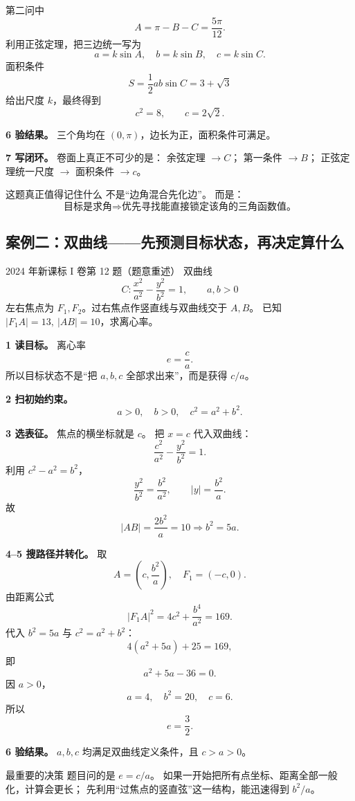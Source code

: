 \documentclass[11pt,a4paper]{ctexart}
\begin{document}
第二问中
\[
A=\pi-B-C=\frac{5\pi}{12}.
\]
利用正弦定理，把三边统一写为
\[
a=k\sin A,\quad b=k\sin B,\quad c=k\sin C.
\]
面积条件
\[
S=\frac12ab\sin C=3+\sqrt3
\]
给出尺度 $k$，最终得到
\[
c^2=8,\qquad
\boxed{c=2\sqrt2}.
\]

\textbf{6 验结果。}
三个角均在 $(0,\pi)$，边长为正，面积条件可满足。

\textbf{7 写闭环。}
卷面上真正不可少的是：
余弦定理 $\rightarrow C$；
第一条件 $\rightarrow B$；
正弦定理统一尺度 $\rightarrow$ 面积条件 $\rightarrow c$。

\begin{trainingbox}{这题真正值得记住什么}
不是“边角混合先化边”。
而是：
\[
\boxed{\text{目标是求角}\Rightarrow\text{优先寻找能直接锁定该角的三角函数值。}}
\]
\end{trainingbox}

\subsection{案例二：双曲线——先预测目标状态，再决定算什么}

\begin{examplebox}{2024 年新课标 I 卷第 12 题（题意重述）}
双曲线
\[
C:\frac{x^2}{a^2}-\frac{y^2}{b^2}=1,\qquad a,b>0
\]
左右焦点为 $F_1,F_2$。过右焦点作竖直线与双曲线交于 $A,B$。
已知 $|F_1A|=13,\ |AB|=10$，求离心率。
\end{examplebox}

\textbf{1 读目标。}
离心率
\[
e=\frac ca.
\]
所以目标状态不是“把 $a,b,c$ 全部求出来”，而是获得 $c/a$。

\textbf{2 扫初始约束。}
\[
a>0,\quad b>0,\quad c^2=a^2+b^2.
\]

\textbf{3 选表征。}
焦点的横坐标就是 $c$。
把 $x=c$ 代入双曲线：
\[
\frac{c^2}{a^2}-\frac{y^2}{b^2}=1.
\]
利用 $c^2-a^2=b^2$，
\[
\frac{y^2}{b^2}=\frac{b^2}{a^2},
\qquad |y|=\frac{b^2}{a}.
\]
故
\[
|AB|=\frac{2b^2}{a}=10
\Rightarrow
b^2=5a.
\]

\textbf{4--5 搜路径并转化。}
取
\[
A=\left(c,\frac{b^2}{a}\right),
\quad F_1=(-c,0).
\]
由距离公式
\[
|F_1A|^2
=4c^2+\frac{b^4}{a^2}
=169.
\]
代入 $b^2=5a$ 与 $c^2=a^2+b^2$：
\[
4(a^2+5a)+25=169,
\]
即
\[
a^2+5a-36=0.
\]
因 $a>0$，
\[
a=4,\quad b^2=20,\quad c=6.
\]
所以
\[
\boxed{e=\frac{3}{2}}.
\]

\textbf{6 验结果。}
$a,b,c$ 均满足双曲线定义条件，且 $c>a>0$。

\begin{trainingbox}{最重要的决策}
题目问的是 $e=c/a$。
如果一开始把所有点坐标、距离全部一般化，计算会更长；
先利用“过焦点的竖直弦”这一结构，能迅速得到 $b^2/a$。
\end{trainingbox}
\end{document}
